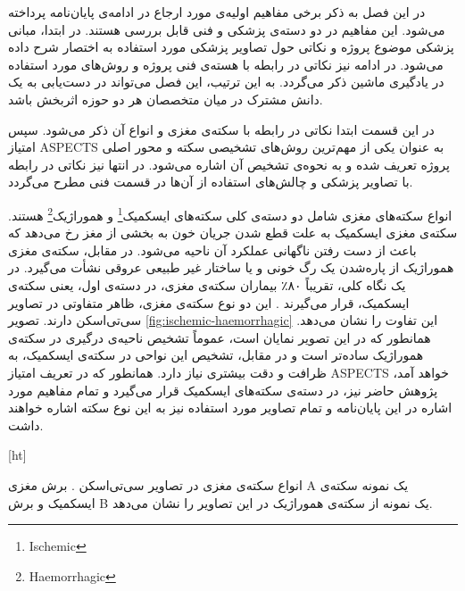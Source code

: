 

در این فصل به ذکر برخی مفاهیم اولیه‌ی مورد ارجاع در ادامه‌ی پایان‌نامه پرداخته می‌شود.
این مفاهیم در دو دسته‌ی پزشکی و فنی قابل بررسی هستند.
در ابتدا، مبانی پزشکی موضوع پروژه و نکاتی حول تصاویر پزشکی مورد استفاده به اختصار شرح داده می‌شود.
در ادامه نیز نکاتی در رابطه با هسته‌ی فنی پروژه و روش‌های مورد استفاده در یادگیری ماشین ذکر می‌گردد.
به این ترتیب، این فصل می‌تواند در دست‌یابی به یک دانش مشترک در میان متخصصان هر دو حوزه اثربخش باشد.


در این قسمت ابتدا نکاتی در رابطه با سکته‌ی مغزی و انواع آن ذکر می‌شود.
سپس امتیاز ASPECTS به عنوان یکی از مهم‌ترین روش‌های تشخیصی سکته و محور اصلی پروژه تعریف شده و
به نحوه‌ی تشخیص آن اشاره می‌شود.
در انتها نیز نکاتی در رابطه با تصاویر پزشکی و چالش‌های استفاده از آن‌ها در قسمت فنی مطرح می‌گردد.


انواع سکته‌های مغزی شامل دو دسته‌ی کلی سکته‌های 
ایسکمیک\footnote{Ischemic}
و 
هموراژیک\footnote{Haemorrhagic} 
هستند.
سکته‌ی مغزی ایسکمیک به علت قطع شدن جریان خون به بخشی از مغز رخ می‌دهد که باعث از دست رفتن ناگهانی عملکرد آن ناحیه می‌شود.
در مقابل، سکته‌ی مغزی هموراژیک از پاره‌شدن یک رگ خونی و یا ساختار غیر طبیعی عروقی نشأت می‌گیرد.
در یک نگاه کلی، تقریباً ۸۰٪ بیماران سکته‌ی مغزی، در دسته‌ی اول، یعنی سکته‌ی ایسکمیک، قرار می‌گیرند \cite{donkor2018stroke}.
این دو نوع سکته‌ی مغزی، ظاهر متفاوتی در تصاویر سی‌تی‌اسکن دارند.
تصویر 
\ref{fig:ischemic-haemorrhagic}
 این تفاوت را نشان می‌دهد.
همانطور که در این تصویر نمایان است، عموماً تشخیص ناحیه‌ی درگیری
در سکته‌ی هموراژیک ساده‌تر است و در مقابل، تشخیص این نواحی در سکته‌ی ایسکمیک، به ظرافت و دقت بیشتری نیاز دارد.
همانطور که در تعریف امتیاز ASPECTS خواهد آمد، پژوهش حاضر نیز، در دسته‌ی 
سکته‌های ایسکمیک قرار می‌گیرد و تمام مفاهیم مورد اشاره در این پایان‌نامه و تمام تصاویر مورد استفاده نیز به این نوع سکته اشاره خواهند داشت.


[ht]
\caption[انواع سکته‌ی مغزی]{انواع سکته‌ی مغزی در تصاویر سی‌تی‌اسکن \cite{le2018ischemic}. برش مغزی A یک نمونه سکته‌ی ایسکمیک و برش B یک نمونه از سکته‌ی هموراژیک در این تصاویر را نشان می‌دهد.}


